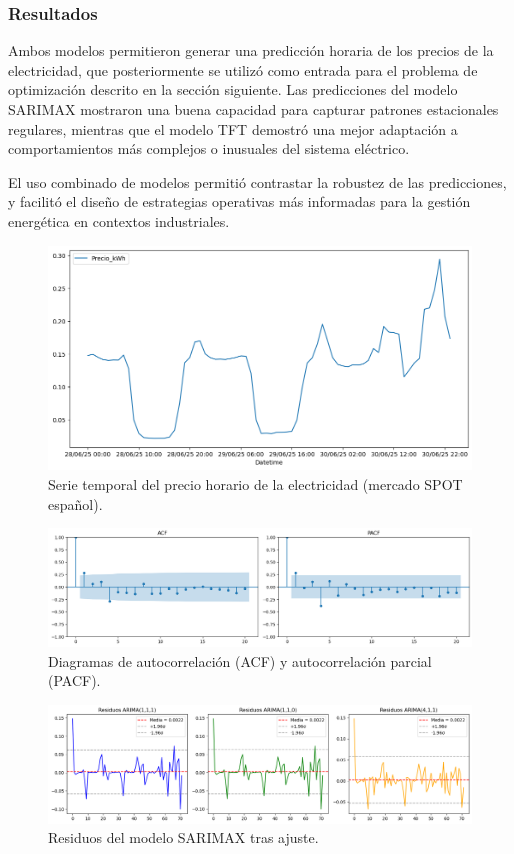 \subsubsection{Resultados}
%
%
%
Ambos modelos permitieron generar una predicción horaria de los precios de la electricidad, que posteriormente se utilizó como entrada para el problema de optimización descrito en la sección siguiente. Las predicciones del modelo SARIMAX mostraron una buena capacidad para capturar patrones estacionales regulares, mientras que el modelo TFT demostró una mejor adaptación a comportamientos más complejos o inusuales del sistema eléctrico.

El uso combinado de modelos permitió contrastar la robustez de las predicciones, y facilitó el diseño de estrategias operativas más informadas para la gestión energética en contextos industriales.

\begin{figure}[H]
    \centering
    \includegraphics[width=0.6\linewidth]{figuras/histoico.png}
    \caption{Serie temporal del precio horario de la electricidad (mercado SPOT español).}
    \label{graficacometa}
\end{figure}

\begin{figure}[H]
    \centering
    \includegraphics[width=0.6\linewidth]{figuras/ACF_PACF.png}
    \caption{Diagramas de autocorrelación (ACF) y autocorrelación parcial (PACF).}
    \label{ACFPACF}
\end{figure}

\begin{figure}[H]
    \centering
    \includegraphics[width=0.6\linewidth]{figuras/residuos_ARIMA.png}
    \caption{Residuos del modelo SARIMAX tras ajuste.}
    \label{residuos}
\end{figure}


